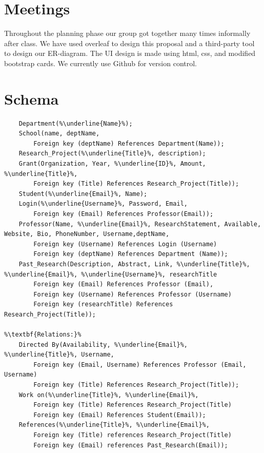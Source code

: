 \documentclass[]{spie}  %
\begin{document}
\section{Meetings}
Throughout the planning phase our group got together many times informally after class.  We have used overleaf to design this proposal and a third-party tool to design our ER-diagram.  The UI design is made using html, css, and modified bootstrap cards.  We currently use Github for version control. 
\section{Schema}
\begin{lstlisting}[escapechar=\%]
%\textbf{Entity Sets:}%
    Department(%\underline{Name}%);
    School(name, deptName,
        Foreign key (deptName) References Department(Name));
    Research_Project(%\underline{Title}%, description);
    Grant(Organization, Year, %\underline{ID}%, Amount, %\underline{Title}%,
        Foreign key (Title) References Research_Project(Title));
    Student(%\underline{Email}%, Name);
    Login(%\underline{Username}%, Password, Email,
        Foreign key (Email) References Professor(Email));
    Professor(Name, %\underline{Email}%, ResearchStatement, Available, Website, Bio, PhoneNumber, Username,deptName,
        Foreign key (Username) References Login (Username)
        Foreign key (deptName) References Department (Name));
    Past_Research(Description, Abstract, Link, %\underline{Title}%, %\underline{Email}%, %\underline{Username}%, researchTitle
        Foreign key (Email) References Professor (Email),
        Foreign key (Username) References Professor (Username)
        Foreign key (researchTitle) References Research_Project(Title));
        
%\textbf{Relations:}%
    Directed By(Availability, %\underline{Email}%, %\underline{Title}%, Username,
        Foreign key (Email, Username) References Professor (Email, Username)
        Foreign key (Title) References Research_Project(Title));
    Work on(%\underline{Title}%, %\underline{Email}%,
        Foreign key (Title) References Research_Project(Title)
        Foreign key (Email) References Student(Email));
    References(%\underline{Title}%, %\underline{Email}%,
        Foreign key (Title) references Research_Project(Title)
        Foreign key (Email) references Past_Research(Email));
\end{lstlisting}
\end{document}
